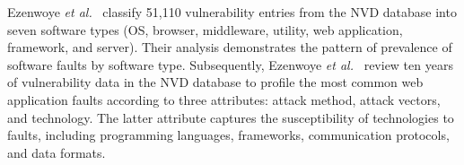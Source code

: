 Ezenwoye \textit{et al.}~\cite{Ezenwoye2020ClassifyingCS} classify 51,110 vulnerability entries from the NVD database into seven software types (OS, browser, middleware, utility, web application, framework, and server). Their analysis demonstrates the pattern of prevalence of software faults by software type. Subsequently, Ezenwoye \textit{et al.}~\cite{Ezenwoye2022WebAW} review ten years of vulnerability data in the NVD database to profile the most common web application faults according to three attributes: attack method, attack vectors, and technology. The latter attribute captures the susceptibility of technologies to faults, including programming languages, frameworks, communication protocols, and data formats. 

